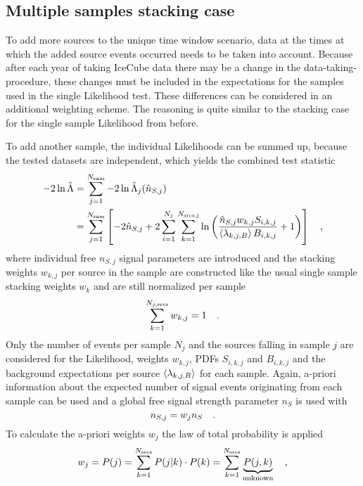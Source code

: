 \subsection{Multiple samples stacking case}
To add more sources to the unique time window scenario, data at the times at which the added source events occurred needs to be taken into account.
Because after each year of taking IceCube data there may be a change in the data-taking-procedure, these changes must be included in the expectations for the samples used in the single Likelihood test.
These differences can be considered in an additional weighting scheme.
The reasoning is quite similar to the stacking case for the single sample Likelihood from before.

To add another sample, the individual Likelihoods can be summed up, because the tested datasets are independent, which yields the combined test statistic
\begin{align}
  -2\ln\hat{\Lambda}
  &= \sum_{j=1}^{N_\text{sam}} -2\ln\hat{\Lambda}_j(\hat{n}_{S,j}) \\
  &= \sum_{j=1}^{N_\text{sam}} \left[
        -2\hat{n}_{S,j} +
        2\sum_{i=1}^{N_j} \sum_{k=1}^{N_\text{srcs,j}} \ln\left(
          \frac{\hat{n}_{S,j} w_{k,j} S_{i,k,j}}
               {\Braket{\lambda_{k,j,B}} B_{i,k,j}}
          + 1
        \right)
      \right]
  \quad\text{,}
\end{align}
where individual free $n_{S,j}$ signal parameters are introduced and the stacking weights $w_{k,j}$ per source in the sample are constructed like the usual single sample stacking weights $w_k$ and are still normalized per sample
\begin{equation}
  \sum_{k=1}^{N_{j,\text{srcs}}} w_{k,j} = 1
  \quad\text{.}
\end{equation}
Only the number of events per sample $N_j$ and the sources falling in sample $j$ are considered for the Likelihood, weights $w_{k,j}$, PDFs $S_{i,k,j}$ and $B_{i,k,j}$ and the background expectations per source $\Braket{\lambda_{k,j,B}}$ for each sample.
Again, a-priori information about the expected number of signal events originating from each sample can be used and a global free signal strength parameter $n_S$ is used with
\begin{equation}
  n_{S,j} = w_j n_S
  \quad\text{.}
\end{equation}
To calculate the a-priori weights $w_j$ the law of total probability is applied 
\begin{equation}
  w_j = P(j) = \sum_{k=1}^{N_\text{srcs}} P(j|k)\cdot P(k)
  = \sum_{k=1}^{N_\text{srcs}} \underbrace{P(j,k)}_\text{unknown}
  \quad\text{,}
\end{equation}
